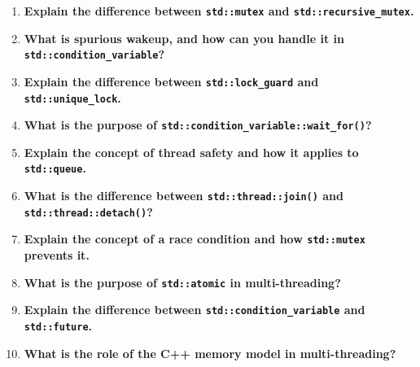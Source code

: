 \documentclass[12pt]{article}
\begin{document}
\begin{enumerate}
    \item \textbf{Explain the difference between \texttt{std::mutex} and \texttt{std::recursive\_mutex}.}

    \item \textbf{What is spurious wakeup, and how can you handle it in \texttt{std::condition\_variable}?}

    \item \textbf{Explain the difference between \texttt{std::lock\_guard} and \texttt{std::unique\_lock}.}

    \item \textbf{What is the purpose of \texttt{std::condition\_variable::wait\_for()}?}

    \item \textbf{Explain the concept of thread safety and how it applies to \texttt{std::queue}.}

    \item \textbf{What is the difference between \texttt{std::thread::join()} and \texttt{std::thread::detach()}?}

    \item \textbf{Explain the concept of a race condition and how \texttt{std::mutex} prevents it.}

    \item \textbf{What is the purpose of \texttt{std::atomic} in multi-threading?}

    \item \textbf{Explain the difference between \texttt{std::condition\_variable} and \texttt{std::future}.}

    \item \textbf{What is the role of the C++ memory model in multi-threading?}
\end{enumerate}
\end{document}
